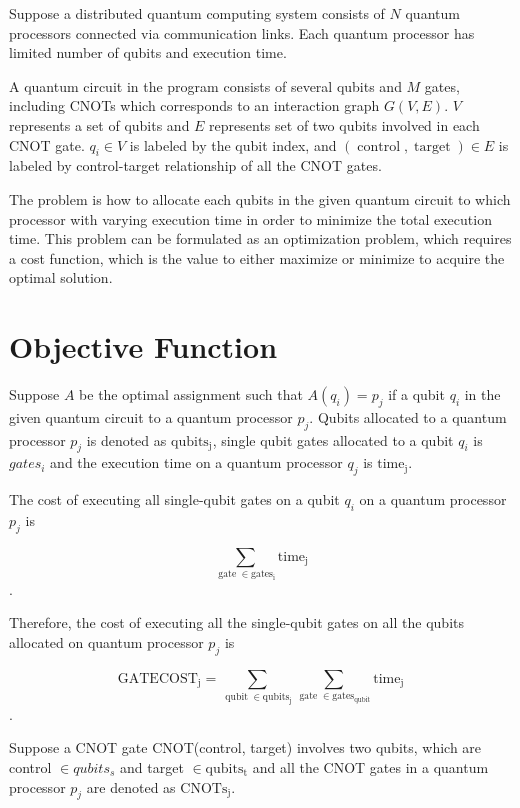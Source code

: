 Suppose a distributed quantum computing system consists of $N$ quantum processors connected via communication links. Each quantum processor has limited number of qubits and execution time.

A quantum circuit in the program consists of several qubits and $M$ gates, including CNOTs which corresponds to an interaction graph $G(V, E)$. $V$ represents a set of qubits and $E$ represents set of two qubits involved in each CNOT gate.  $q_i \in V$ is labeled by the qubit index, and $(\operatorname{control}, \operatorname{target}) \in E$ is labeled by control-target relationship of all the CNOT gates.

The problem is how to allocate each qubits in the given quantum circuit to which processor with varying execution time in order to minimize the total execution time. This problem can be formulated as an optimization problem, which requires a cost function, which is the value to either maximize or minimize to acquire the optimal solution.

\section{Objective Function}
Suppose $A$ be the optimal assignment such that $A(q_i) = p_j$ if a qubit $q_i$ in the given quantum circuit to a quantum processor $p_j$. Qubits allocated to a quantum processor $p_j$ is denoted as $\operatorname{qubits_j}$, single qubit gates allocated to a qubit $q_i$ is $gates_i$ and the execution time on a quantum processor $q_j$ is $\operatorname{time_j}$.

The cost of executing all single-qubit gates on a qubit $q_i$ on a quantum processor $p_j$ is 

 \begin{equation}
\sum_{ \operatorname{gate} \in  \operatorname{gates_i}}  \operatorname{time_j}
 \end{equation}.
 
Therefore, the cost of executing all the single-qubit gates on all the qubits allocated on quantum processor $p_j$ is 

 \begin{equation}
\operatorname{GATECOST_j }= \sum_{ \operatorname{qubit} \in  \operatorname{qubits_j}} \sum_{ \operatorname{gate} \in  \operatorname{gates_{qubit}}}  \operatorname{time_j}
 \end{equation}.

Suppose a CNOT gate CNOT(control, target) involves two qubits, which are control $\in qubits_s$ and target $\in \operatorname{qubits_t}$ and all the CNOT gates in a quantum processor $p_j$ are denoted as $\operatorname{CNOTs_{j}}$.

